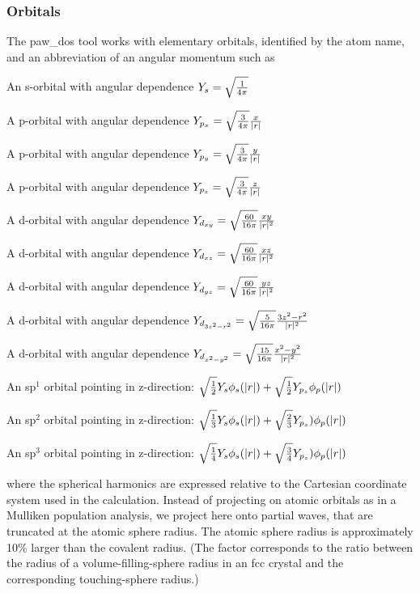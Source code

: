 \documentclass[final,12pt]{article}
\begin{document}
{\subsubsection{Orbitals}

The paw\_dos tool works with elementary orbitals, identified by the atom
name, and an abbreviation of an angular momentum such as
\begin{description}
\item[s]An s-orbital with angular dependence 
$Y_s=\sqrt{1\over{4\pi}}$
\item[px]A p-orbital with angular dependence 
$Y_{p_x}=\sqrt{3\over{4\pi}} {x\over{|r|}}$
\item[py]A p-orbital with angular dependence 
$Y_{p_y}=\sqrt{3\over{4\pi}} {y\over{|r|}}$
\item[pz]A p-orbital with angular dependence 
$Y_{p_z}=\sqrt{3\over{4\pi}} {z\over{|r|}}$
\item[dxy]A d-orbital with angular dependence 
$Y_{d_{xy}}=\sqrt{60\over{16\pi}} {{xy}\over{|r|^2}}$
\item[dxz]A d-orbital with angular dependence 
$Y_{d_{xz}}=\sqrt{60\over{16\pi}} {{xz}\over{|r|^2}}$
\item[dyz]A d-orbital with angular dependence 
$Y_{d_{yz}}=\sqrt{60\over{16\pi}} {{yz}\over{|r|^2}}$
\item[d3z2-r2]A d-orbital with angular dependence 
$Y_{d_{3z^2-r^2}}=\sqrt{5\over{16\pi}} {{3z^2-r^2}\over{|r|^2}}$
\item[dx2-y2]A d-orbital with angular dependence 
$Y_{d_{x^2-y^2}}=\sqrt{15\over{16\pi}} {{x^2-y^2}\over{|r|^2}}$
\item[sp] An sp$^1$ orbital pointing in z-direction: 
$\sqrt{1\over{2}}Y_s \phi_s(|r|) + \sqrt{1\over{2}}Y_{p_z}\phi_p(|r|)$
\item[sp2] An sp$^2$ orbital pointing in z-direction: 
$\sqrt{1\over{3}}Y_s\phi_s(|r|) + \sqrt{2\over{3}}Y_{p_z})\phi_p(|r|)$
\item[sp3] An sp$^3$ orbital pointing in z-direction: 
$\sqrt{1\over{4}}Y_s\phi_s(|r|) + \sqrt{3\over{4}}Y_{p_z})\phi_p(|r|)$
\item
\end{description}
where the spherical harmonics are expressed relative to the Cartesian
coordinate system used in the calculation. Instead of projecting on
atomic orbitals as in a Mulliken population analysis, we project here
onto partial waves, that are truncated at the atomic sphere radius.
The atomic sphere radius is approximately 10\% larger than the
covalent radius. (The factor corresponds to the ratio between the
radius of a volume-filling-sphere radius in an fcc crystal and the
corresponding touching-sphere radius.)

}
\end{document}
